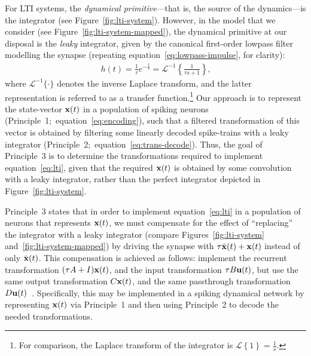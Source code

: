 For LTI systems, the \emph{dynamical primitive}---that is, the source of the dynamics---is the integrator (see Figure~\ref{fig:lti-system}).
However, in the model that we consider (see Figure~\ref{fig:lti-system-mapped}), the dynamical primitive at our disposal is the \emph{leaky} integrator, given by the canonical first-order lowpass filter modelling the synapse (repeating equation~\ref{eq:lowpass-impulse}, for clarity):
\begin{align} \label{eq:lowpass-laplace}
h(t) = \frac{1}{\tau} e^{-\frac{t}{\tau}} = \mathcal{L}^{-1}\left\{ \frac{1}{\tau s + 1} \right\} \text{,}
\end{align}
where $\mathcal{L}^{-1}\{ \cdot \}$ denotes the inverse Laplace transform, and the latter representation is referred to as a transfer function.\footnote{
For comparison, the Laplace transform of the integrator is $\mathcal{L}\left\{ 1 \right\} = \frac{1}{s}$.}
Our approach is to represent the state-vector $\mathbf{x}(t)$ in a population of spiking neurons (Principle~1;~equation~\ref{eq:encoding}), such that a filtered transformation of this vector is obtained by filtering some linearly decoded spike-trains with a leaky integrator (Principle~2;~equation~\ref{eq:trans-decode}).
Thus, the goal of Principle~3 is to determine the transformations required to implement equation~\ref{eq:lti}, given that the required $\mathbf{x}(t)$ is obtained by some convolution with a leaky integrator, rather than the perfect integrator depicted in Figure~\ref{fig:lti-system}.

Principle~3 states that in order to implement equation~\ref{eq:lti} in a population of neurons that represents $\mathbf{x}(t)$, we must compensate for the effect of ``replacing'' the integrator with a leaky integrator (compare Figures~\ref{fig:lti-system} and~\ref{fig:lti-system-mapped}) by driving the synapse with $\tau \dot{\mathbf{x}}(t) + \mathbf{x}(t)$ instead of only $\dot{\mathbf{x}}(t)$.
This compensation is achieved as follows: implement the recurrent transformation $(\tau A + I)\mathbf{x}(t)$, and the input transformation $\tau B \mathbf{u}(t)$, but use the same output transformation $C\mathbf{x}(t)$, and the same passthrough transformation $D\mathbf{u}(t)$~\citep[][pp.~221--225]{eliasmith2003a}.
Specifically, this may be implemented in a spiking dynamical network by representing $\mathbf{x}(t)$ via Principle~1 and then using Principle~2 to decode the needed transformations.

